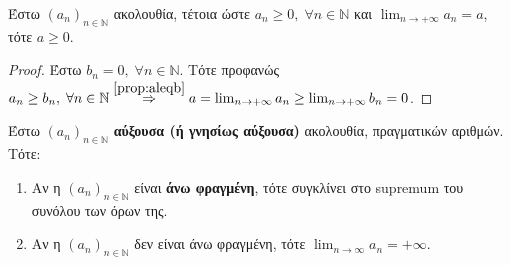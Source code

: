 \begin{cor}
  Έστω $ (a_{n})_{n \in \mathbb{N}} $ ακολουθία, τέτοια ώστε 
  $ a_{n} \geq 0, \; \forall n \in \mathbb{N} $ και 
  $ \lim_{n \to +\infty} a_{n} = a$, τότε $ a \geq 0 $.
\end{cor}

\begin{proof}
  Έστω $ b_{n} = 0, \; \forall n \in \mathbb{N} $. Τότε προφανώς 
  $ a_{n} \geq b_{n}, \; \forall n
  \in \mathbb{N} \overset{\ref{prop:aleqb}}{\Rightarrow} 
  a = \lim_{n \to +\infty} a_{n} \geq \lim_{n \to +\infty} b_{n} = 0$.
\end{proof}

\begin{mybox2}
  \begin{thm}
    \label{thm:aukssygk}
    Έστω $ {(a_{n})}_{n \in \mathbb{N}} $ \textbf{αύξουσα (ή γνησίως αύξουσα)} 
    ακολουθία, πραγματικών αριθμών. Τότε:
    \begin{enumerate}
      \item Αν η $ {(a_{n})}_{n \in \mathbb{N}} $ είναι \textbf{άνω φραγμένη}, 
        τότε συγκλίνει στο supremum του συνόλου των όρων της.
      \item Αν η $ {(a_{n})}_{n \in \mathbb{N}} $ δεν είναι άνω φραγμένη, τότε 
        $ \lim_{n \to \infty} a_{n}=+\infty $.
    \end{enumerate}
  \end{thm}
\end{mybox2}

